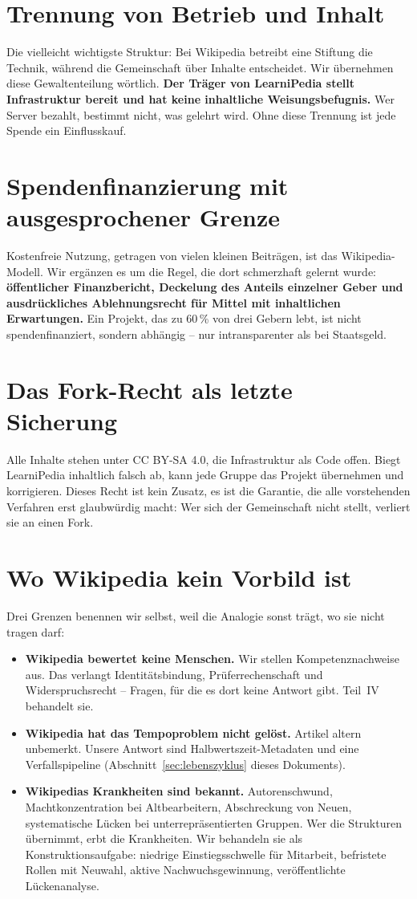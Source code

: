 \documentclass[11pt,a4paper]{article}
\begin{document}
\section{Trennung von Betrieb und Inhalt}
Die vielleicht wichtigste Struktur: Bei Wikipedia betreibt eine Stiftung die Technik, während die Gemeinschaft über Inhalte entscheidet. Wir übernehmen diese Gewaltenteilung wörtlich. \textbf{Der Träger von LearniPedia stellt Infrastruktur bereit und hat keine inhaltliche Weisungsbefugnis.} Wer Server bezahlt, bestimmt nicht, was gelehrt wird. Ohne diese Trennung ist jede Spende ein Einflusskauf.

\section{Spendenfinanzierung mit ausgesprochener Grenze}
Kostenfreie Nutzung, getragen von vielen kleinen Beiträgen, ist das Wikipedia-Modell. Wir ergänzen es um die Regel, die dort schmerzhaft gelernt wurde: \textbf{öffentlicher Finanzbericht, Deckelung des Anteils einzelner Geber und ausdrückliches Ablehnungsrecht für Mittel mit inhaltlichen Erwartungen.} Ein Projekt, das zu 60\,\% von drei Gebern lebt, ist nicht spendenfinanziert, sondern abhängig -- nur intransparenter als bei Staatsgeld.

\section{Das Fork-Recht als letzte Sicherung}
Alle Inhalte stehen unter CC BY-SA 4.0, die Infrastruktur als Code offen. Biegt LearniPedia inhaltlich falsch ab, kann jede Gruppe das Projekt übernehmen und korrigieren. Dieses Recht ist kein Zusatz, es ist die Garantie, die alle vorstehenden Verfahren erst glaubwürdig macht: Wer sich der Gemeinschaft nicht stellt, verliert sie an einen Fork.

\section{Wo Wikipedia kein Vorbild ist}
Drei Grenzen benennen wir selbst, weil die Analogie sonst trägt, wo sie nicht tragen darf:
\begin{itemize}[label=--]
    \item \textbf{Wikipedia bewertet keine Menschen.} Wir stellen Kompetenznachweise aus. Das verlangt Identitätsbindung, Prüferrechenschaft und Widerspruchsrecht -- Fragen, für die es dort keine Antwort gibt. Teil~IV behandelt sie.
    \item \textbf{Wikipedia hat das Tempoproblem nicht gelöst.} Artikel altern unbemerkt. Unsere Antwort sind Halbwertszeit-Metadaten und eine Verfallspipeline (Abschnitt~\ref{sec:lebenszyklus} dieses Dokuments).
    \item \textbf{Wikipedias Krankheiten sind bekannt.} Autorenschwund, Machtkonzentration bei Altbearbeitern, Abschreckung von Neuen, systematische Lücken bei unterrepräsentierten Gruppen. Wer die Strukturen übernimmt, erbt die Krankheiten. Wir behandeln sie als Konstruktionsaufgabe: niedrige Einstiegsschwelle für Mitarbeit, befristete Rollen mit Neuwahl, aktive Nachwuchsgewinnung, veröffentlichte Lückenanalyse.
\end{itemize}
\end{document}
